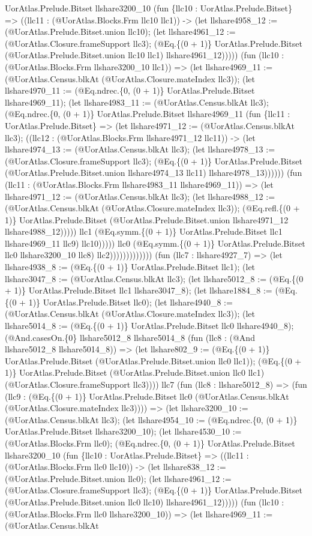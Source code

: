 \documentclass[11pt]{article}
\begin{document}
UorAtlas.Prelude.Bitset llshare3200\_10 (fun \{llc10 : UorAtlas.Prelude.Bitset\} => ((llc11 : (@UorAtlas.Blocks.Frm llc10 llc1)) -> (let llshare4958\_12 := (@UorAtlas.Prelude.Bitset.union llc10); (let llshare4961\_12 := (@UorAtlas.Closure.frameSupport llc3); (@Eq.\{(0 + 1)\} UorAtlas.Prelude.Bitset (@UorAtlas.Prelude.Bitset.union llc10 llc1) llshare4961\_12))))) (fun (llc10 : (@UorAtlas.Blocks.Frm llshare3200\_10 llc1)) => (let llshare4969\_11 := (@UorAtlas.Census.blkAt (@UorAtlas.Closure.mateIndex llc3)); (let llshare4970\_11 := (@Eq.ndrec.\{0, (0 + 1)\} UorAtlas.Prelude.Bitset llshare4969\_11); (let llshare4983\_11 := (@UorAtlas.Census.blkAt llc3); (@Eq.ndrec.\{0, (0 + 1)\} UorAtlas.Prelude.Bitset llshare4969\_11 (fun \{llc11 : UorAtlas.Prelude.Bitset\} => (let llshare4971\_12 := (@UorAtlas.Census.blkAt llc3); ((llc12 : (@UorAtlas.Blocks.Frm llshare4971\_12 llc11)) -> (let llshare4974\_13 := (@UorAtlas.Census.blkAt llc3); (let llshare4978\_13 := (@UorAtlas.Closure.frameSupport llc3); (@Eq.\{(0 + 1)\} UorAtlas.Prelude.Bitset (@UorAtlas.Prelude.Bitset.union llshare4974\_13 llc11) llshare4978\_13)))))) (fun (llc11 : (@UorAtlas.Blocks.Frm llshare4983\_11 llshare4969\_11)) => (let llshare4971\_12 := (@UorAtlas.Census.blkAt llc3); (let llshare4988\_12 := (@UorAtlas.Census.blkAt (@UorAtlas.Closure.mateIndex llc3)); (@Eq.refl.\{(0 + 1)\} UorAtlas.Prelude.Bitset (@UorAtlas.Prelude.Bitset.union llshare4971\_12 llshare4988\_12))))) llc1 (@Eq.symm.\{(0 + 1)\} UorAtlas.Prelude.Bitset llc1 llshare4969\_11 llc9) llc10))))) llc0 (@Eq.symm.\{(0 + 1)\} UorAtlas.Prelude.Bitset llc0 llshare3200\_10 llc8) llc2))))))))))))) (fun (llc7 : llshare4927\_7) => (let llshare4938\_8 := (@Eq.\{(0 + 1)\} UorAtlas.Prelude.Bitset llc1); (let llshare3047\_8 := (@UorAtlas.Census.blkAt llc3); (let llshare5012\_8 := (@Eq.\{(0 + 1)\} UorAtlas.Prelude.Bitset llc1 llshare3047\_8); (let llshare1884\_8 := (@Eq.\{(0 + 1)\} UorAtlas.Prelude.Bitset llc0); (let llshare4940\_8 := (@UorAtlas.Census.blkAt (@UorAtlas.Closure.mateIndex llc3)); (let llshare5014\_8 := (@Eq.\{(0 + 1)\} UorAtlas.Prelude.Bitset llc0 llshare4940\_8); (@And.casesOn.\{0\} llshare5012\_8 llshare5014\_8 (fun (llc8 : (@And llshare5012\_8 llshare5014\_8)) => (let llshare802\_9 := (@Eq.\{(0 + 1)\} UorAtlas.Prelude.Bitset (@UorAtlas.Prelude.Bitset.union llc0 llc1)); (@Eq.\{(0 + 1)\} UorAtlas.Prelude.Bitset (@UorAtlas.Prelude.Bitset.union llc0 llc1) (@UorAtlas.Closure.frameSupport llc3)))) llc7 (fun (llc8 : llshare5012\_8) => (fun (llc9 : (@Eq.\{(0 + 1)\} UorAtlas.Prelude.Bitset llc0 (@UorAtlas.Census.blkAt (@UorAtlas.Closure.mateIndex llc3)))) => (let llshare3200\_10 := (@UorAtlas.Census.blkAt llc3); (let llshare4954\_10 := (@Eq.ndrec.\{0, (0 + 1)\} UorAtlas.Prelude.Bitset llshare3200\_10); (let llshare4530\_10 := (@UorAtlas.Blocks.Frm llc0); (@Eq.ndrec.\{0, (0 + 1)\} UorAtlas.Prelude.Bitset llshare3200\_10 (fun \{llc10 : UorAtlas.Prelude.Bitset\} => ((llc11 : (@UorAtlas.Blocks.Frm llc0 llc10)) -> (let llshare838\_12 := (@UorAtlas.Prelude.Bitset.union llc0); (let llshare4961\_12 := (@UorAtlas.Closure.frameSupport llc3); (@Eq.\{(0 + 1)\} UorAtlas.Prelude.Bitset (@UorAtlas.Prelude.Bitset.union llc0 llc10) llshare4961\_12))))) (fun (llc10 : (@UorAtlas.Blocks.Frm llc0 llshare3200\_10)) => (let llshare4969\_11 := (@UorAtlas.Census.blkAt 
\end{document}
